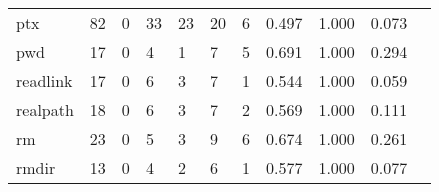 \begin{longtable}{lp{1.2cm}p{1.2cm}p{1.2cm}p{1.2cm}p{1.2cm}p{1.2cm}p{1.2cm}p{1.2cm}p{1.2cm}p{1.2cm}}
ptx       &                                    82 &                                                  0 &                                                 33 &                                                 23 &                                                 20 &                                                  6 &                                         0.497 &                                              1.000 &                                              0.073 \\
pwd       &                                    17 &                                                  0 &                                                  4 &                                                  1 &                                                  7 &                                                  5 &                                         0.691 &                                              1.000 &                                              0.294 \\
readlink  &                                    17 &                                                  0 &                                                  6 &                                                  3 &                                                  7 &                                                  1 &                                         0.544 &                                              1.000 &                                              0.059 \\
realpath  &                                    18 &                                                  0 &                                                  6 &                                                  3 &                                                  7 &                                                  2 &                                         0.569 &                                              1.000 &                                              0.111 \\
rm        &                                    23 &                                                  0 &                                                  5 &                                                  3 &                                                  9 &                                                  6 &                                         0.674 &                                              1.000 &                                              0.261 \\
rmdir     &                                    13 &                                                  0 &                                                  4 &                                                  2 &                                                  6 &                                                  1 &                                         0.577 &                                              1.000 &                                              0.077 \\

\end{longtable}
